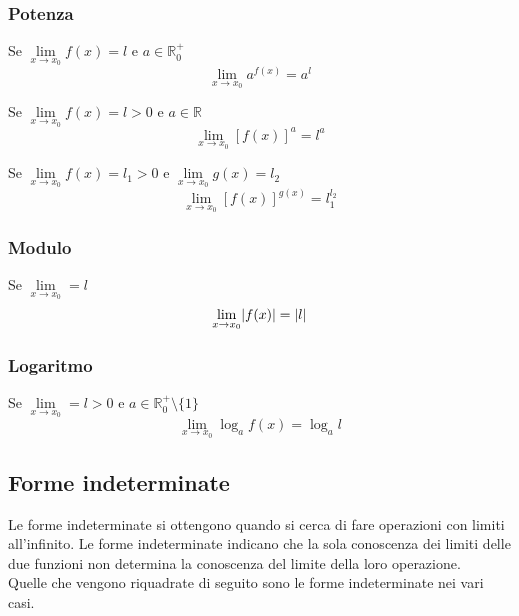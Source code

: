 \subsubsection{Potenza}
\begin{potenzaLimiti}
  Se $\lim\limits_{x\to x_0}f(x)=l$ e $a\in\mathbb{R}_0^+$
  \begin{equation*}
    \lim\limits_{x\to x_0}a^{f(x)} = a^l
  \end{equation*}
\end{potenzaLimiti}
\begin{potenzaLimiti1}
  Se $\lim\limits_{x\to x_0}f(x)=l>0$ e $a\in\mathbb{R}$
  \begin{equation*}
    \lim\limits_{x\to x_0}[f(x)]^a = l^a
  \end{equation*}
\end{potenzaLimiti1}
\begin{potenzaLimiti2}
  Se $\lim\limits_{x\to x_0}f(x)=l_1>0$ e $\lim\limits_{x\to x_0}g(x)=l_2$
  \begin{equation*}
    \lim\limits_{x\to x_0}[f(x)]^{g(x)} = l_1^{l_2}
  \end{equation*}
\end{potenzaLimiti2}

\subsubsection{Modulo}
\begin{moduloLimiti}
  Se $\lim\limits_{x\to x_0}=l$
  \begin{equation*}
    \lim\limits_{x\to x_0}\lvert f(x)\rvert=\lvert l\rvert
  \end{equation*}
\end{moduloLimiti}

\subsubsection{Logaritmo}
\begin{logLimiti}
  Se $\lim\limits_{x\to x_0}=l>0$ e $a\in\mathbb{R}_0^+\setminus\{1\}$
  \begin{equation*}
    \lim\limits_{x\to x_0}\log_af(x)=\log_al
  \end{equation*}
\end{logLimiti}

\subsection{Forme indeterminate}
Le forme indeterminate si ottengono quando si cerca di fare operazioni con limiti all'infinito. Le
forme indeterminate indicano che la sola conoscenza dei limiti delle due funzioni non determina la 
conoscenza del limite della loro operazione.\\
Quelle che vengono riquadrate di seguito sono le forme indeterminate nei vari casi.
